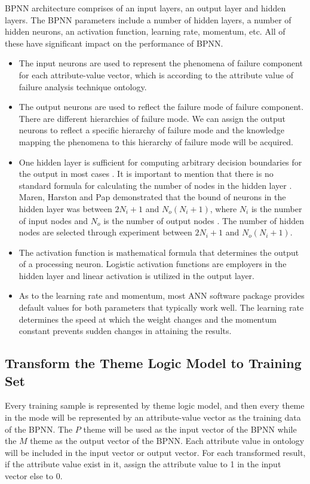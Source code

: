 \documentclass{elsart}
\begin{document}
BPNN architecture comprises of an input layers, an output layer and hidden layers. The BPNN parameters include a number of hidden layers, a number of hidden neurons, an activation function, learning rate, momentum, etc. All of these have significant impact on the performance of BPNN.
\begin{itemize}
\item The input neurons are used to represent the phenomena of failure
  component for each attribute-value vector, which is according to the attribute value of failure analysis technique ontology.
\item The output neurons are used to reflect the failure mode of failure component. There are different hierarchies of failure mode. We can assign the output neurons to reflect a specific hierarchy of failure mode and the knowledge mapping the phenomena to this hierarchy of failure mode will be acquired. 
\item One hidden layer is sufficient for computing arbitrary decision
  boundaries for the output in most cases \cite{Khaw1995}. It is important to
  mention that there is no standard formula for calculating the number
  of nodes in the hidden layer \cite{turban:oaj}. Maren, Harston
  and Pap demonstrated that the bound of neurons in the hidden layer
  was between $2N_i+1$ and $N_o(N_i +1)$, where $N_i$ is the number of
  input nodes and $N_o$ is the number of output nodes
  \cite{maren1990hnc}. The number of hidden nodes are selected through
  experiment between $2N_i+1$ and $N_o(N_i +1)$. 
\item The activation function is mathematical formula that determines the output of a processing neuron. Logistic activation functions are employers in the hidden layer and linear activation is utilized in the output layer.  
\item As to the learning rate and momentum, most ANN software package provides default values for both parameters that typically work well. The learning rate determines the speed at which the weight changes and the momentum constant prevents sudden changes in attaining the results.  


\end{itemize}

\subsection{Transform the Theme Logic Model to Training Set}
\label{sec:transf-theme-logic}

Every training sample is represented by theme logic model, and then
every theme in the mode will be represented by an attribute-value
vector as the training data of the BPNN. The $P$ theme will be  used as
the input vector of the BPNN while the $M$ theme as the output vector of
the BPNN. Each attribute value in ontology will be included in the
input vector or output vector. For each transformed result, if the attribute value exist in it, assign the attribute value to 1 in the input vector else to 0. 
\end{document}
